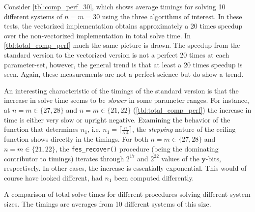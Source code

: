 Consider \cref{tbl:comp_perf_30}, which shows average timings for solving 10 different systems of $n = m = 30$ using the three algorithms of interest. In these tests, the vectorized implementation obtains approximately a 20 times speedup over the non-vectorized implementation in total solve time. In \cref{tbl:total_comp_perf} much the same picture is drawn. The speedup from the standard version to the vectorized version is not a perfect 20 times at each parameter-set, however, the general trend is that at least a 20 times speedup is seen. Again, these measurements are not a perfect science but do show a trend. 

An interesting characteristic of the timings of the standard version is that the increase in solve time seems to be \textit{slower} in some parameter ranges. For instance, at $n = m \in \{27, 28\}$ and $n = m \in \{21,22\}$ (\cref{tbl:total_comp_perf}) the increase in time is either very slow or upright negative. Examining the behavior of the function that determines $n_1$, i.e. $n_1 = \lceil \frac{n}{5.4} \rceil$, the \textit{stepping} nature of the ceiling function shows directly in the timings. For both $n = m \in \{27, 28\}$ and $n = m \in \{21,22\}$, the \texttt{fes\_recover()} procedure (being the dominating contributor to timings) iterates through $2^{17}$ and $2^{22}$ values of the $\mathbf{y}$-bits, respectively. In other cases, the increase is essentially exponential. This would of course have looked different, had $n_1$ been computed differently.

\begin{table}[t]
    \begin{center}
    \end{center}
    \caption{A comparison of total solve times for different procedures solving different system sizes. The timings are averages from 10 different systems of this size.} \label{tbl:total_comp_perf}
\end{table}

